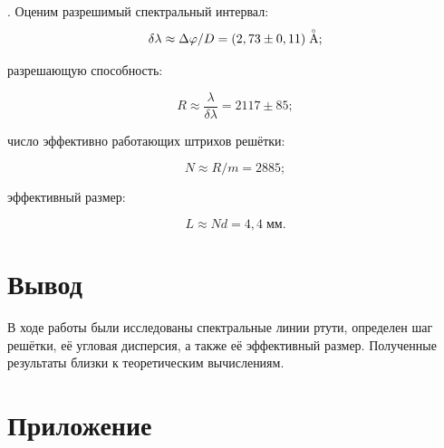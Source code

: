 \documentclass[a4paper,12pt]{article} %
\begin{document}
. Оценим разрешимый спектральный интервал: 
\begin{equation}
			\delta\lambda \approx \Delta\varphi/D = (2,73 \pm 0,11) \buildrel _{\circ} \over {\mathrm{A}};
		\end{equation}


\noindent разрешающую способность:

 \begin{equation}
			R \approx \frac{\lambda}{\delta\lambda} = 2117 \pm 85;
		\end{equation}

\noindent число эффективно работающих штрихов решётки: 

\begin{equation}
			N \approx R/m = 2885;
		\end{equation}

\noindent эффективный размер:
		
		\begin{equation}
			L \approx Nd = 4,4\; \text{мм.}
		\end{equation}


\section{Вывод}

\medskip

\noindent В ходе работы были исследованы спектральные линии ртути, определен шаг решётки, её угловая дисперсия, а также её эффективный размер. Полученные результаты близки к теоретическим вычислениям.

\newpage

\section{Приложение}
\end{document}
